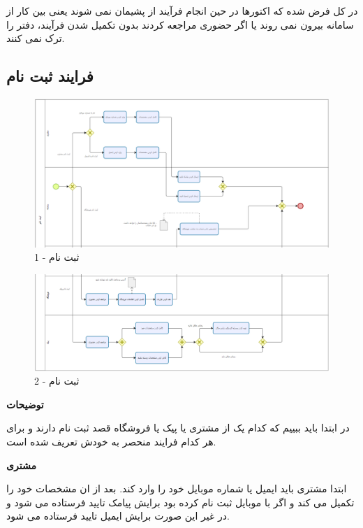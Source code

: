\documentclass[12pt,a4paper]{article}
\begin{document}
در کل فرض شده که اکتورها در حین انجام فرآیند از پشیمان نمی شوند یعنی بین کار از سامانه بیرون نمی روند یا اگر حضوری مراجعه کردند بدون تکمیل شدن فرآیند، دفتر را ترک نمی کنند.
	\pagebreak

	\subsection{فرایند ثبت نام} \label{section.function.register}
		
		\begin{figure}[h!]
			\begin{center}
				\includegraphics[width=14cm]{images/Bizagi Register 1.png}	
			\end{center}
			\caption{ثبت نام - 1}
		\end{figure}
		\begin{figure}[h!]
			\begin{center}
				\includegraphics[width=14cm]{images/Bizagi Register 2.png}	
			\end{center}
			\caption{ثبت نام - 2}
		\end{figure}
		
		\textbf{توضیحات}
		
		
		در ابتدا باید ببییم که کدام یک از مشتری یا پیک یا فروشگاه قصد ثبت نام دارند و برای هر کدام فرایند منحصر به خودش تعریف شده است.
		
		\textbf{مشتری}
		
		ابتدا مشتری باید ایمیل یا شماره موبایل خود را وارد کند. بعد از ان مشخصات خود را تکمیل می کند و اگر با موبایل ثبت نام کرده بود برایش پیامک تایید فرستاده می شود و در غیر این صورت برایش ایمیل تایید فرستاده می شود.\\
		
\end{document}
